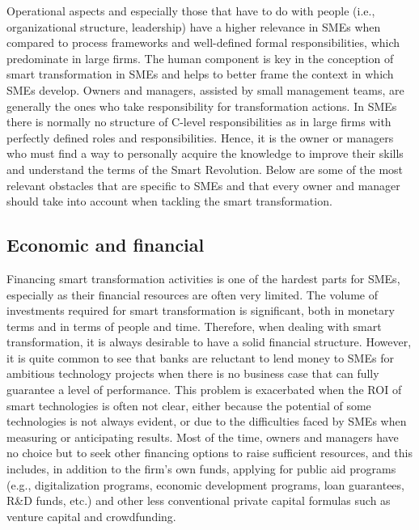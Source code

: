 \documentclass[
  letterpaper,
  DIV=11,
  numbers=noendperiod]{scrreprt}
\begin{document}
Operational aspects and especially those that have to do with people
(i.e., organizational structure, leadership) have a higher relevance in
SMEs when compared to process frameworks and well-defined formal
responsibilities, which predominate in large firms. The human component
is key in the conception of smart transformation in SMEs and helps to
better frame the context in which SMEs develop. Owners and managers,
assisted by small management teams, are generally the ones who take
responsibility for transformation actions. In SMEs there is normally no
structure of C-level responsibilities as in large firms with perfectly
defined roles and responsibilities. Hence, it is the owner or managers
who must find a way to personally acquire the knowledge to improve their
skills and understand the terms of the Smart Revolution. Below are some
of the most relevant obstacles that are specific to SMEs and that every
owner and manager should take into account when tackling the smart
transformation.

\hypertarget{economic-and-financial}{%
\subsection{Economic and financial}\label{economic-and-financial}}

Financing smart transformation activities is one of the hardest parts
for SMEs, especially as their financial resources are often very
limited. The volume of investments required for smart transformation is
significant, both in monetary terms and in terms of people and time.
Therefore, when dealing with smart transformation, it is always
desirable to have a solid financial structure. However, it is quite
common to see that banks are reluctant to lend money to SMEs for
ambitious technology projects when there is no business case that can
fully guarantee a level of performance. This problem is exacerbated when
the ROI of smart technologies is often not clear, either because the
potential of some technologies is not always evident, or due to the
difficulties faced by SMEs when measuring or anticipating results. Most
of the time, owners and managers have no choice but to seek other
financing options to raise sufficient resources, and this includes, in
addition to the firm's own funds, applying for public aid programs
(e.g., digitalization programs, economic development programs, loan
guarantees, R\&D funds, etc.) and other less conventional private
capital formulas such as venture capital and crowdfunding.
\end{document}

